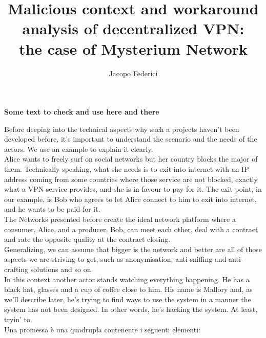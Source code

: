 \documentclass[]{article}
\title{Malicious context and workaround analysis of decentralized VPN:\\the case of Mysterium Network}
\author{Jacopo Federici}
\begin{document}
		
	\textbf{Some text to check and use here and there}
	
	Before deeping into the technical aspects why such a projects haven't been developed before, it's important to understand the scenario and the needs of the actors. We use an example to explain it clearly.\\
	Alice wants to freely surf on social networks but her country blocks the major of them. Technically speaking, what she needs is to exit into internet with an IP address coming from some countries where those service are not blocked, exactly what a VPN service provides, and she is in favour to pay for it.
	The exit point, in our example, is Bob who agrees to let Alice connect to him to exit into internet, and he wants to be paid for it.\\
	The Networks presented before create the ideal network platform where a consumer, Alice, and a producer, Bob, can meet each other, deal with a contract and rate the opposite quality at the contract closing.\\
	Generalizing, we can assume that bigger is the network and better are all of those aspects we are striving to get, such as anonymisation, anti-sniffing and anti-crafting solutions and so on.\\
	In this context another actor stands watching everything happening. He has a black hat, glasses and a cup of coffee close to him. His name is Mallory and, as we'll describe later, he's trying to find ways to use the system in a manner the system has not been designed. In other words, he's hacking the system. At least, tryin' to.\\
	
	
	
	
	
	Una promessa è una quadrupla contenente i seguenti elementi:
	
\end{document}
